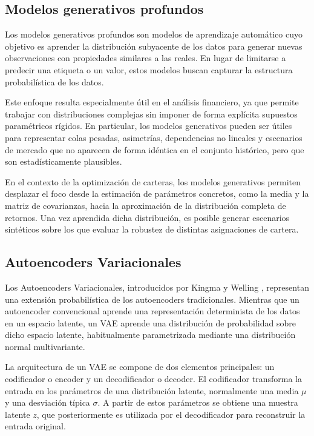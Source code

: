 \subsection{Modelos generativos profundos}

Los modelos generativos profundos son modelos de aprendizaje automático cuyo objetivo es aprender la distribución subyacente de los datos para generar nuevas observaciones con propiedades similares a las reales. En lugar de limitarse a predecir una etiqueta o un valor, estos modelos buscan capturar la estructura probabilística de los datos.

Este enfoque resulta especialmente útil en el análisis financiero, ya que permite trabajar con distribuciones complejas sin imponer de forma explícita supuestos paramétricos rígidos. En particular, los modelos generativos pueden ser útiles para representar colas pesadas, asimetrías, dependencias no lineales y escenarios de mercado que no aparecen de forma idéntica en el conjunto histórico, pero que son estadísticamente plausibles.

En el contexto de la optimización de carteras, los modelos generativos permiten desplazar el foco desde la estimación de parámetros concretos, como la media y la matriz de covarianzas, hacia la aproximación de la distribución completa de retornos. Una vez aprendida dicha distribución, es posible generar escenarios sintéticos sobre los que evaluar la robustez de distintas asignaciones de cartera.

\subsection{Autoencoders Variacionales}

Los Autoencoders Variacionales, introducidos por Kingma y Welling \citeyear{kingma2013auto}, representan una extensión probabilística de los autoencoders tradicionales. Mientras que un autoencoder convencional aprende una representación determinista de los datos en un espacio latente, un VAE aprende una distribución de probabilidad sobre dicho espacio latente, habitualmente parametrizada mediante una distribución normal multivariante.

La arquitectura de un VAE se compone de dos elementos principales: un codificador o encoder y un decodificador o decoder. El codificador transforma la entrada en los parámetros de una distribución latente, normalmente una media $\mu$ y una desviación típica $\sigma$. A partir de estos parámetros se obtiene una muestra latente $z$, que posteriormente es utilizada por el decodificador para reconstruir la entrada original.

